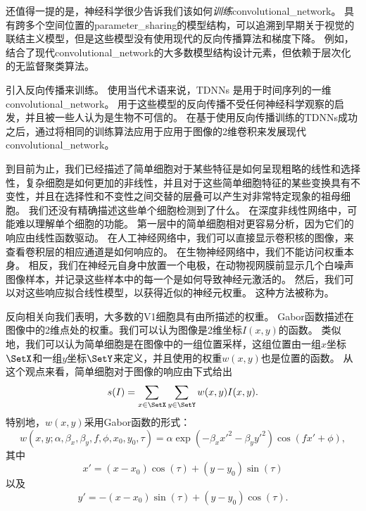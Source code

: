  
还值得一提的是，神经科学很少告诉我们该如何\emph{训练}\gls{convolutional_network}。
具有跨多个空间位置的\gls{parameter_sharing}的模型结构，可以追溯到早期关于视觉的联结主义模型\citep{Marr76}，但是这些模型没有使用现代的反向传播算法和梯度下降。
例如，\citep{Fukushima80}结合了现代\gls{convolutional_network}的大多数模型结构设计元素，但依赖于层次化的无监督聚类算法。

\cite{Lang+Hinton88}引入反向传播来训练。
使用当代术语来说，TDNNs 是用于时间序列的一维\gls{convolutional_network}。
用于这些模型的反向传播不受任何神经科学观察的启发，并且被一些人认为是生物不可信的。
在基于使用反向传播训练的TDNNs成功之后，\cite{LeCun89d}通过将相同的训练算法应用于应用于图像的2维卷积来发展现代\gls{convolutional_network}。

到目前为止，我们已经描述了简单细胞对于某些特征是如何呈现粗略的线性和选择性，复杂细胞是如何更加的非线性，并且对于这些简单细胞特征的某些变换具有不变性，并且在选择性和不变性之间交替的层叠可以产生对非常特定现象的祖母细胞。
我们还没有精确描述这些单个细胞检测到了什么。
在深度非线性网络中，可能难以理解单个细胞的功能。
第一层中的简单细胞相对更容易分析，因为它们的响应由线性函数驱动。
在人工神经网络中，我们可以直接显示卷积核的图像，来查看卷积层的相应通道是如何响应的。
在生物神经网络中，我们不能访问权重本身。
相反，我们在神经元自身中放置一个电极，在动物视网膜前显示几个白噪声图像样本，并记录这些样本中的每一个是如何导致神经元激活的。
然后，我们可以对这些响应拟合线性模型，以获得近似的神经元权重。
这种方法被称为\citep{ringach2004reverse}。
 
 
反向相关向我们表明，大多数的V1细胞具有由所描述的权重。
Gabor函数描述在图像中的2维点处的权重。我们可以认为图像是2维坐标$I(x,y)$的函数。
类似地，我们可以认为简单细胞是在图像中的一组位置采样，这组位置由一组$x$坐标$\SetX$和一组$y$坐标$\SetY$来定义，并且使用的权重$w(x,y)$也是位置的函数。
从这个观点来看，简单细胞对于图像的响应由下式给出
\begin{equation}
  s(I)=\sum_{x\in \SetX} \sum_{y\in \SetY} w(x, y)I(x,y).
\end{equation}
特别地，$w(x,y)$采用Gabor函数的形式：
\begin{equation}
  w(x, y; \alpha, \beta_x, \beta_y, f, \phi, x_0, y_0, \tau) = \alpha \exp(-\beta_x x'^2 - \beta_y y'^2) \cos (fx' + \phi),
\end{equation}
其中
\begin{equation}
  x' = (x-x_0)\cos(\tau) + (y-y_0)\sin(\tau)
\end{equation}
以及
\begin{equation}
  y' = -(x-x_0) \sin(\tau) + (y-y_0)\cos(\tau).
\end{equation}

